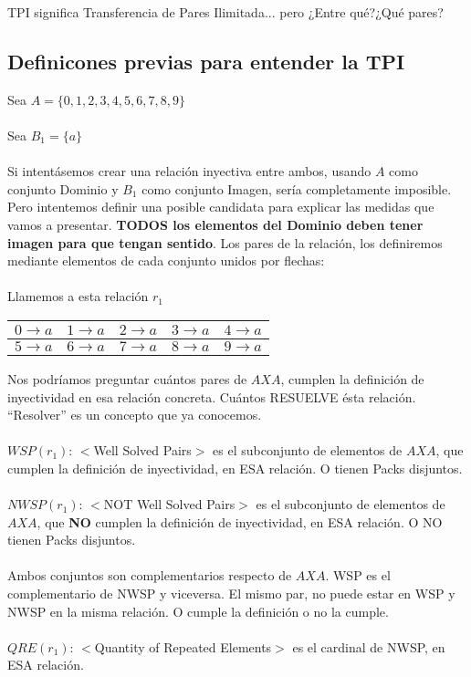 	\noindent
	TPI significa Transferencia de Pares Ilimitada... pero ¿Entre qué?¿Qué pares?
	
	\subsection{Definicones previas para entender la TPI}
	\noindent
	Sea $A=\{0,1,2,3,4,5,6,7,8,9\}$\\\\
	Sea $B_{1} = \{a\}$\\\\
	Si intentásemos crear una relación inyectiva entre ambos, usando $A$ como conjunto Dominio y $B_{1}$ como conjunto Imagen, sería completamente imposible. Pero intentemos definir una posible candidata para explicar las medidas que vamos a presentar. \textbf{TODOS los elementos del Dominio deben tener imagen para que tengan sentido}. Los pares de la relación, los definiremos mediante elementos de cada conjunto unidos por flechas:\\\\
	Llamemos a esta relación $r_{1}$
	\begin{table}[h!]
		\begin{tabular}{|c|c|c|c|c|}
			\hline
			$0 \longrightarrow a$ & $1 \longrightarrow a$ & $2 \longrightarrow a$ & $3 \longrightarrow a$ & $4 \longrightarrow a$ \\ 
			\hline
			$5 \longrightarrow a$ & $6 \longrightarrow a$ & $7 \longrightarrow a$ & $8 \longrightarrow a$ & $9 \longrightarrow a$ \\  
			\hline
		\end{tabular}
	\end{table}
	
	\noindent
	Nos podríamos preguntar cuántos pares de $A X A$, cumplen la definición de inyectividad en esa relación concreta. Cuántos RESUELVE ésta relación. ``Resolver'' es un concepto que ya conocemos.\\\\
	$WSP(r_{1})$: $<$Well Solved Pairs$>$ es el subconjunto de elementos de $A X A$, que cumplen la definición de inyectividad, en ESA relación. O tienen Packs disjuntos.\\\\
	$NWSP(r_{1})$: $<$NOT Well Solved Pairs$>$ es el subconjunto de elementos de $A X A$, que \textbf{NO} cumplen la definición de inyectividad, en ESA relación. O NO tienen Packs disjuntos.\\\\
	Ambos conjuntos son complementarios respecto de $A X A$. WSP es el complementario de NWSP y viceversa. El mismo par, no puede estar en WSP y NWSP en la misma relación. O cumple la definición o no la cumple.\\\\
	$QRE(r_{1})$: $<$Quantity of Repeated Elements$>$ es el cardinal de NWSP, en ESA relación.
	\\
	
